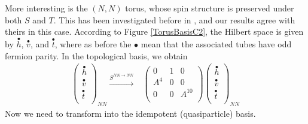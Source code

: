 \documentclass[12pt,a4paper]{article}
\newcounter{arrow}
\newcommand{\unit}{\mathds{1}}
\begin{document}
More interesting is the $(N,N)$ torus, whose spin structure is preserved under both $S$ and $T$. 
This has been investigated before in \cite{ware2016}, and our results agree with theirs in this case. 
According to Figure \ref{TorusBasisC2}, the Hilbert space is given by $\overset{\bullet}{h}$, $\overset{\bullet}{v}$, and $\overset{\bullet}{t}$,
where as before the $\bullet$ mean that the associated tubes have odd fermion parity.
In the topological basis, we obtain
\begin{align}
\left( \begin{matrix}
\overset{\bullet}{h}\\
\overset{\bullet}{v}\\
\overset{\bullet}{t}\\
\end{matrix} \right)_{NN} 
\xrightarrow{S^{NN \rightarrow NN}} & \left( \begin{matrix}
0&1&0\\
 A^4&0&0\\
0&0&A^{10}\\
\end{matrix} \right)
\left( \begin{matrix}
\overset{\bullet}{h}\\
\overset{\bullet}{v}\\
\overset{\bullet}{t}\\
\end{matrix} \right)_{NN}
\end{align}
Now we need to transform into the idempotent (quasiparticle) basis. 
\end{document}
